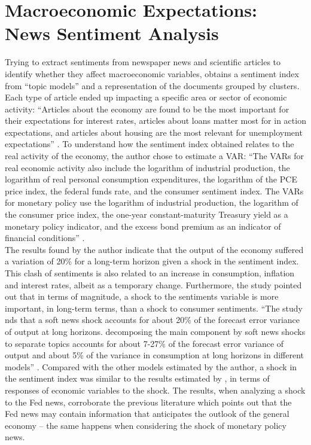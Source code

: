\section{Macroeconomic Expectations: News Sentiment Analysis}

Trying to extract sentiments from newspaper news and scientific articles to identify whether they affect macroeconomic variables, \cite{ostapenko2020macroeconomic} obtains a sentiment index from ``topic models'' and a representation of the documents grouped by clusters. Each type of article ended up impacting a specific area or sector of economic activity: ``Articles about the
economy are found to be the most important for their expectations for interest rates, articles about loans matter most for in action expectations, and articles about housing are the most relevant for unemployment expectations'' \cite[p.2]{ostapenko2020macroeconomic}. To understand how the sentiment index obtained relates to the real activity of the economy, the author chose to estimate a VAR: ``The VARs for real economic activity also include the logarithm of industrial production, the logarithm of real personal consumption expenditures, the logarithm of the PCE price
index, the federal funds rate, and the consumer sentiment index. The VARs for monetary policy use the logarithm of industrial production, the logarithm of the consumer price index, the one-year constant-maturity Treasury yield as a monetary policy indicator, and the excess bond premium as an indicator of financial conditions'' \cite [p.2]{ostapenko2020macroeconomic}.\\

The results found by the author indicate that the output of the economy suffered a variation of 20\% for a long-term horizon given a shock in the sentiment index. This clash of sentiments is also related to an increase in consumption, inflation and interest rates, albeit as a temporary change. Furthermore, the study pointed out that in terms of magnitude, a shock to the sentiments variable is more important, in long-term terms, than a shock to consumer sentiments. ``The study nds that a soft news shock accounts for about 20\% of the forecast error variance of output at long horizons. decomposing the main component by soft news shocks to separate topics accounts for about 7-27\% of the forecast error variance of output and about 5\% of the variance in consumption at long horizons in different models'' \cite[p.40]{ostapenko2020macroeconomic}. Compared with the other models estimated by the author, a shock in the sentiment index was similar to the results estimated by \cite{barsky2012information}, in terms of responses of economic variables to the shock. The results, when analyzing a shock to the Fed news, corroborate the previous literature \cite{jarocinski2020deconstructing, smith2015has} which points out that the Fed news may contain information that anticipates the outlook of the general economy -- the same happens when considering the shock of monetary policy news.\\


